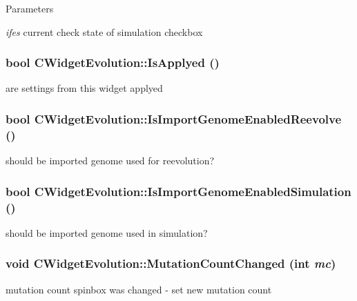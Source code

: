 \begin{DoxyParams}{Parameters}
\item[{\em ifes}]current check state of simulation checkbox \end{DoxyParams}
\hypertarget{classCWidgetEvolution_a9d1d32df0aa44d939f778329d1c1408a}{
\subsubsection[{IsApplyed}]{\setlength{\rightskip}{0pt plus 5cm}bool CWidgetEvolution::IsApplyed ()}}
\label{classCWidgetEvolution_a9d1d32df0aa44d939f778329d1c1408a}
are settings from this widget applyed \hypertarget{classCWidgetEvolution_a8d75d5c02040eb4946081468f50f09d5}{
\subsubsection[{IsImportGenomeEnabledReevolve}]{\setlength{\rightskip}{0pt plus 5cm}bool CWidgetEvolution::IsImportGenomeEnabledReevolve ()}}
\label{classCWidgetEvolution_a8d75d5c02040eb4946081468f50f09d5}
should be imported genome used for reevolution? \hypertarget{classCWidgetEvolution_a57efe43b895556eedf5fc55cf1bf6e88}{
\subsubsection[{IsImportGenomeEnabledSimulation}]{\setlength{\rightskip}{0pt plus 5cm}bool CWidgetEvolution::IsImportGenomeEnabledSimulation ()}}
\label{classCWidgetEvolution_a57efe43b895556eedf5fc55cf1bf6e88}
should be imported genome used in simulation? \hypertarget{classCWidgetEvolution_a26dffc6b20f733569a4b43aa66ffc04a}{
\subsubsection[{MutationCountChanged}]{\setlength{\rightskip}{0pt plus 5cm}void CWidgetEvolution::MutationCountChanged (int {\em mc})}}
\label{classCWidgetEvolution_a26dffc6b20f733569a4b43aa66ffc04a}
mutation count spinbox was changed -\/ set new mutation count


